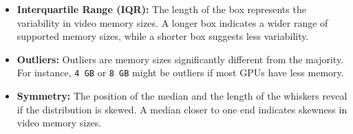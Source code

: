 \documentclass{article}
\begin{document}
\begin{itemize}
\begin{itemize}
\begin{itemize}
				\item \textbf{Interquartile Range (IQR):} The length of the box represents the variability in video memory sizes. A longer box indicates a wider range of supported memory sizes, while a shorter box suggests less variability.
				\item \textbf{Outliers:} Outliers are memory sizes significantly different from the majority. For instance, \texttt{4 GB} or \texttt{8 GB} might be outliers if most GPUs have less memory.
				\item \textbf{Symmetry:} The position of the median and the length of the whiskers reveal if the distribution is skewed. A median closer to one end indicates skewness in video memory sizes.
			\end{itemize}
		\end{itemize}
	\end{itemize}
\end{document}
